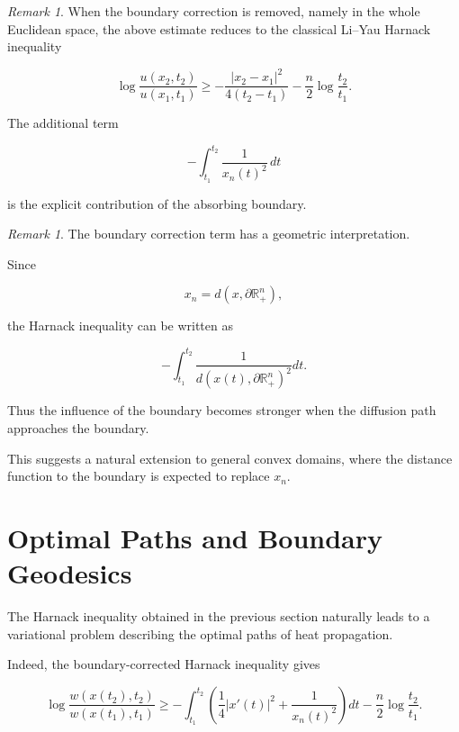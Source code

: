 \documentclass[11pt]{amsart}
\theoremstyle{definition}
\theoremstyle{remark}
\newtheorem{remark}[theorem]{Remark}
\begin{document}

\begin{remark}

When the boundary correction is removed, namely in the whole
Euclidean space, the above estimate reduces to the classical
Li--Yau Harnack inequality

\[
\log
\frac{u(x_2,t_2)}
     {u(x_1,t_1)}
\geq
-\frac{|x_2-x_1|^2}{4(t_2-t_1)}
-\frac n2
\log\frac{t_2}{t_1}.
\]

The additional term

\[
-\int_{t_1}^{t_2}
\frac1{x_n(t)^2}\,dt
\]

is the explicit contribution of the absorbing boundary.

\end{remark}



\begin{remark}

The boundary correction term has a geometric interpretation.

Since

\[
x_n=d(x,\partial\mathbb R^n_+),
\]

the Harnack inequality can be written as

\[
-\int_{t_1}^{t_2}
\frac1{
d(x(t),\partial\mathbb R^n_+)^2
}
dt .
\]

Thus the influence of the boundary becomes stronger when the
diffusion path approaches the boundary.

This suggests a natural extension to general convex domains,
where the distance function to the boundary is expected to replace
$x_n$.

\end{remark}


\section{Optimal Paths and Boundary Geodesics}


The Harnack inequality obtained in the previous section naturally
leads to a variational problem describing the optimal paths of heat
propagation.

Indeed, the boundary-corrected Harnack inequality gives

\[
\log
\frac{w(x(t_2),t_2)}
     {w(x(t_1),t_1)}
\geq
-\int_{t_1}^{t_2}
\left(
\frac14 |x'(t)|^2
+
\frac1{x_n(t)^2}
\right)dt
-
\frac n2
\log\frac{t_2}{t_1}.
\]
\end{document}
